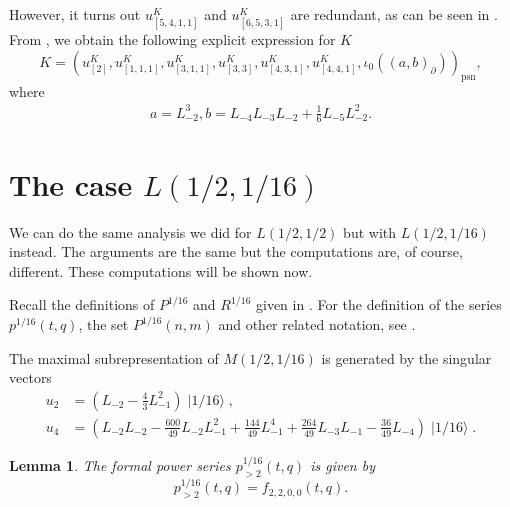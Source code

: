 \documentclass[a4paper, 12pt, reqno]{amsart}
\newtheorem{lemma}[theorem]{Lemma}
\theoremstyle{remark}
\numberwithin{equation}{subsection}
\DeclareMathOperator{\psn}{psn}
\DeclareMathOperator{\vacsixteen}{|1/16\rangle}
\begin{document}
However, it turns out $u^K_{[5, 4, 1, 1]}$ and $u^K_{[6, 5, 3, 1]}$ are redundant, as can be seen in \cite[m11-m15.ipynb]{sagemath2}.
From \cite[Theorem 2]{andrews_singular_2022}, we obtain the following explicit expression for $K$
\begin{equation*}
  K = (u^K_{[2]}, u^K_{[1, 1, 1]}, u^K_{[3, 1, 1]}, u^K_{[3, 3]}, u^K_{[4, 3, 1]}, u^K_{[4, 4, 1]}, \iota_0((a, b)_{\partial}))_{\psn},
\end{equation*}
where
\begin{align*}
  a = L_{-2}^3, b = L_{-4}L_{-3}L_{-2} + \tfrac{1}{6}L_{-5}L_{-2}^2.
\end{align*}


\section{The case $L(1/2, 1/16)$}
\label{sec:case-l12-116}

We can do the same analysis we did for $L(1/2, 1/2)$ but with $L(1/2, 1/16)$ instead.
The arguments are the same but the computations are, of course, different.
These computations will be shown now.

Recall the definitions of $P^{1/16}$ and $R^{1/16}$ given in .
For the definition of the series $p^{1/16}(t, q)$, the set $P^{1/16}(n, m)$ and other related notation, see .

The maximal subrepresentation of $M(1/2, 1/16)$ is generated by the singular vectors
\begin{align*}
  u_2 &= (L_{-2} - \tfrac{4}{3} L_{-1}^2)\vacsixteen, \\
  u_4 &= (L_{-2}L_{-2} - \tfrac{600}{49}L_{-2}L_{-1}^2 + \tfrac{144}{49}L_{-1}^4 + \tfrac{264}{49}L_{-3}L_{-1} - \tfrac{36}{49}L_{-4})\vacsixteen.
\end{align*}

\begin{lemma}
  \label{lmm:31}
  The formal power series $p^{1/16}_{>2}(t, q)$ is given by
  \begin{equation*}
    p^{1/16}_{>2}(t, q) = f_{2, 2, 0, 0}(t, q).
  \end{equation*}
\end{lemma}
\end{document}
